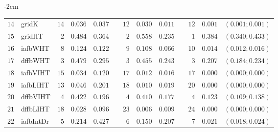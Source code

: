 \begin{table*}[!htbp]
\begin{adjustwidth*}{}{-2cm}
\begin{tabular}{@{}rlrrrrrrrrrcc@{}}
\footnotesize{$14$} & \footnotesize{gridK    } & \footnotesize{$14$} & \footnotesize{$0.036$} & \footnotesize{$0.037$} && \footnotesize{$12$} & \footnotesize{$0.030$} & \footnotesize{$0.011$} && \footnotesize{$12$} & \footnotesize{$0.001$} & \footnotesize{$(0.001;0.001)$} \\
\footnotesize{$15$} & \footnotesize{gridHT   } & \footnotesize{$2 $} & \footnotesize{$0.484$} & \footnotesize{$0.364$} && \footnotesize{$2 $} & \footnotesize{$0.558$} & \footnotesize{$0.235$} && \footnotesize{$1 $} & \footnotesize{$0.384$} & \footnotesize{$(0.340;0.433)$} \\
\footnotesize{$16$} & \footnotesize{iafbWHT  } & \footnotesize{$8 $} & \footnotesize{$0.124$} & \footnotesize{$0.122$} && \footnotesize{$9 $} & \footnotesize{$0.108$} & \footnotesize{$0.066$} && \footnotesize{$10$} & \footnotesize{$0.014$} & \footnotesize{$(0.012;0.016)$} \\
\footnotesize{$17$} & \footnotesize{dffbWHT  } & \footnotesize{$3 $} & \footnotesize{$0.479$} & \footnotesize{$0.295$} && \footnotesize{$3 $} & \footnotesize{$0.455$} & \footnotesize{$0.243$} && \footnotesize{$3 $} & \footnotesize{$0.207$} & \footnotesize{$(0.184;0.234)$} \\
\footnotesize{$18$} & \footnotesize{iafbVIHT } & \footnotesize{$15$} & \footnotesize{$0.034$} & \footnotesize{$0.120$} && \footnotesize{$17$} & \footnotesize{$0.012$} & \footnotesize{$0.016$} && \footnotesize{$17$} & \footnotesize{$0.000$} & \footnotesize{$(0.000;0.000)$} \\
\footnotesize{$19$} & \footnotesize{iafbLIHT } & \footnotesize{$13$} & \footnotesize{$0.046$} & \footnotesize{$0.201$} && \footnotesize{$18$} & \footnotesize{$0.010$} & \footnotesize{$0.019$} && \footnotesize{$20$} & \footnotesize{$0.000$} & \footnotesize{$(0.000;0.000)$} \\
\footnotesize{$20$} & \footnotesize{dffbVIHT } & \footnotesize{$4 $} & \footnotesize{$0.422$} & \footnotesize{$0.196$} && \footnotesize{$4 $} & \footnotesize{$0.410$} & \footnotesize{$0.177$} && \footnotesize{$4 $} & \footnotesize{$0.123$} & \footnotesize{$(0.109;0.138)$} \\
\footnotesize{$21$} & \footnotesize{dffbLIHT } & \footnotesize{$18$} & \footnotesize{$0.028$} & \footnotesize{$0.096$} && \footnotesize{$23$} & \footnotesize{$0.006$} & \footnotesize{$0.009$} && \footnotesize{$24$} & \footnotesize{$0.000$} & \footnotesize{$(0.000;0.000)$} \\
\footnotesize{$22$} & \footnotesize{iafbIntDr} & \footnotesize{$5 $} & \footnotesize{$0.214$} & \footnotesize{$0.427$} && \footnotesize{$6 $} & \footnotesize{$0.150$} & \footnotesize{$0.207$} && \footnotesize{$7 $} & \footnotesize{$0.021$} & \footnotesize{$(0.018;0.024)$} \\

\end{tabular}
\end{adjustwidth*}
\end{table*}
